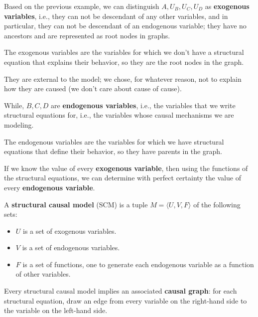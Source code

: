 Based on the previous example, we can distinguish $A, U_B, U_C, U_D$ as
\textbf{exogenous variables}, i.e., they can not be descendant of any other variables,
and in particular, they can not be descendant of an endogenous variable; they have
no ancestors and are represented as root nodes in graphs.

\begin{definition}
    The exogenous variables are the variables for which we don't have a structural
    equation that explains their behavior, so they are the root nodes in the graph.
\end{definition}

They are external to the model; we chose, for whatever reason, not to explain how
they are caused (we don't care about cause of cause).

While, $B, C, D$ are \textbf{endogenous variables}, i.e., the variables that we
write structural equations for, i.e., the variables whose causal mechanisms we
are modeling.

\begin{definition}
    The endogenous variables are the variables for which we have structural
    equations that define their behavior, so they have parents in the graph.
\end{definition}

If we know the value of every \textbf{exogenous variable}, then using the functions
of the structural equations, we can determine with perfect certainty the value
of every \textbf{endogenous variable}.

\begin{definition}
    A \textbf{structural causal model} (SCM) is a tuple $M = \langle U, V, F \rangle$
    of the following sets:
    \begin{itemize}
        \item $U$ is a set of exogenous variables.
        \item $V$ is a set of endogenous variables.
        \item $F$ is a set of functions, one to generate each endogenous variable
              as a function of other variables.
    \end{itemize}
\end{definition}

Every structural causal model implies an associated \textbf{causal graph}: for each
structural equation, draw an edge from every variable on the right-hand side to the
variable on the left-hand side.

